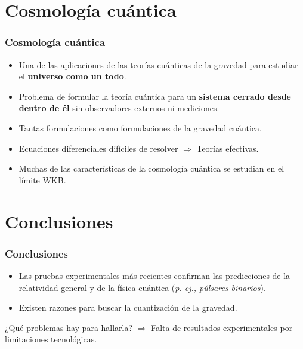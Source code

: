 \documentclass{beamer}
\begin{document}
\section{Cosmología cuántica}
\begin{frame}
\frametitle{Cosmología cuántica}
\begin{itemize}
 \item Una de las aplicaciones de las teorías cuánticas de la gravedad para estudiar el \textbf{universo como un todo}.
 \item Problema de formular la teoría cuántica para un \textbf{sistema cerrado desde dentro de él} sin observadores externos ni mediciones.
 \item Tantas formulaciones como formulaciones de la gravedad cuántica.
 \item Ecuaciones diferenciales difíciles de resolver $\Rightarrow$ Teorías efectivas.
 \item Muchas de las características de la cosmología cuántica se estudian en el límite WKB.
\end{itemize}
\end{frame}

\section{Conclusiones}
\begin{frame}
\frametitle{Conclusiones}
\begin{block}{}
  \begin{itemize}
    \item Las pruebas experimentales más recientes confirman las predicciones de la relatividad general y de la física cuántica (\textit{p. ej., púlsares binarios}).
    \item Existen razones para buscar la cuantización de la gravedad.
  \end{itemize}
\end{block}
\begin{alertblock}{¿Qué problemas hay para hallarla?}
  $\Rightarrow$ Falta de resultados experimentales por limitaciones tecnológicas.
\end{alertblock}
\end{frame}
\end{document}
